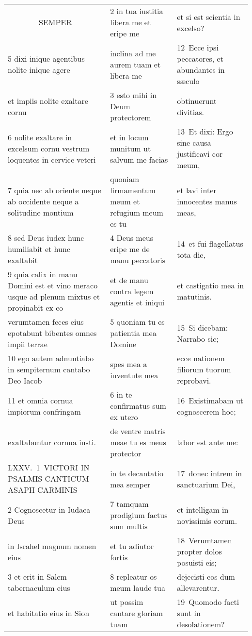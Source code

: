 \documentclass{article}
\begin{document}
\begin{longtable}{@{}p{}p{}p{}@{}}
    SEMPER	&	2 in tua iustitia libera me et eripe me	&	et si est scientia in excelso?	\\
5 dixi inique agentibus nolite inique agere	&	inclina ad me aurem tuam et libera me	&	12 Ecce ipsi peccatores, et abundantes in sæculo	\\
et impiis nolite exaltare cornu	&	3 esto mihi in Deum protectorem	&	obtinuerunt divitias.	\\
6 nolite exaltare in excelsum cornu vestrum loquentes in cervice veteri	&	et in locum munitum ut salvum me facias	&	13 Et dixi: Ergo sine causa justificavi cor meum,	\\
7 quia nec ab oriente neque ab occidente neque a solitudine montium	&	quoniam firmamentum meum et refugium meum es tu	&	et lavi inter innocentes manus meas,	\\
8 sed Deus iudex hunc humiliabit et hunc exaltabit	&	4 Deus meus eripe me de manu peccatoris	&	14 et fui flagellatus tota die,	\\
9 quia calix in manu Domini est et vino meraco usque ad plenum mixtus et propinabit ex eo	&	et de manu contra legem agentis et iniqui	&	et castigatio mea in matutinis.	\\
verumtamen feces eius epotabunt bibentes omnes impii terrae	&	5 quoniam tu es patientia mea Domine	&	15 Si dicebam: Narrabo sic;	\\
10 ego autem adnuntiabo in sempiternum cantabo Deo Iacob	&	spes mea a iuventute mea	&	ecce nationem filiorum tuorum reprobavi.	\\
11 et omnia cornua impiorum confringam	&	6 in te confirmatus sum ex utero	&	16 Existimabam ut cognoscerem hoc;	\\
exaltabuntur cornua iusti.	&	de ventre matris meae tu es meus protector	&	labor est ante me:	\\
LXXV. 1 VICTORI IN PSALMIS CANTICUM ASAPH CARMINIS	&	in te decantatio mea semper	&	17 donec intrem in sanctuarium Dei,	\\
2 Cognoscetur in Iudaea Deus	&	7 tamquam prodigium factus sum multis	&	et intelligam in novissimis eorum.	\\
in Israhel magnum nomen eius	&	et tu adiutor fortis	&	18 Verumtamen propter dolos posuisti eis;	\\
3 et erit in Salem tabernaculum eius	&	8 repleatur os meum laude tua	&	dejecisti eos dum allevarentur.	\\
et habitatio eius in Sion	&	ut possim cantare gloriam tuam	&	19 Quomodo facti sunt in desolationem?	\\

\end{longtable}
\end{document}

